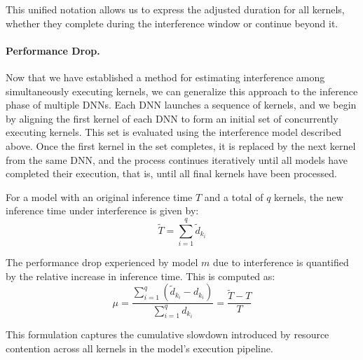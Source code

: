 This unified notation allows us to express the adjusted duration for all kernels, whether they complete during the interference window or continue beyond it.

\paragraph{Performance Drop.} Now that we have established a method for estimating interference among simultaneously executing kernels, we can generalize this approach to the inference phase of multiple DNNs. Each DNN launches a sequence of kernels, and we begin by aligning the first kernel of each DNN to form an initial set of concurrently executing kernels. This set is evaluated using the interference model described above. Once the first kernel in the set completes, it is replaced by the next kernel from the same DNN, and the process continues iteratively until all models have completed their execution, that is, until all final kernels have been processed.

For a model with an original inference time $T$ and a total of $q$ kernels, the new inference time under interference is given by:
\begin{equation*}
	\tilde{T} = \sum_{i=1}^{q} \tilde{d}_{k_i}
\end{equation*}

The performance drop experienced by model $m$ due to interference is quantified by the relative increase in inference time. This is computed as:
\begin{equation}\label{eq:performance_drop}
	\mu = \frac{\sum_{i=1}^{q} (\tilde{d}_{k_i} - d_{k_i})}{\sum_{i=1}^{q} d_{k_i}} = \frac{\tilde{T} - T}{T}
\end{equation}

This formulation captures the cumulative slowdown introduced by resource contention across all kernels in the model's execution pipeline.


